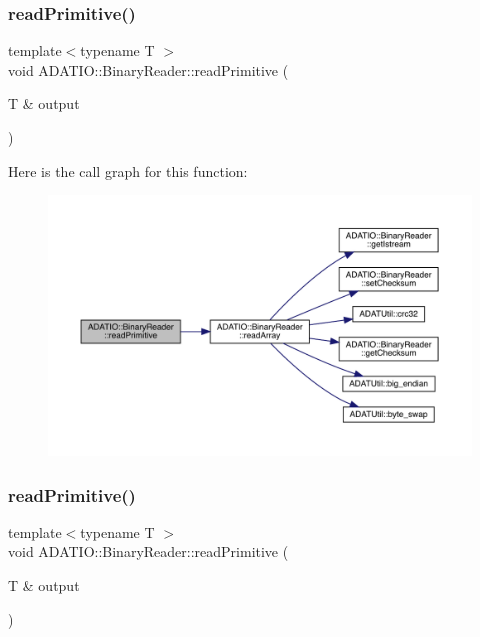 \subsubsection{\texorpdfstring{readPrimitive()}{readPrimitive()}\hspace{0.1cm}{\footnotesize\ttfamily [1/2]}}
{\footnotesize\ttfamily template$<$typename T $>$ \\
void A\+D\+A\+T\+I\+O\+::\+Binary\+Reader\+::read\+Primitive (\begin{DoxyParamCaption}\item[{T \&}]{output }\end{DoxyParamCaption})\hspace{0.3cm}{\ttfamily [protected]}}

Here is the call graph for this function\+:\nopagebreak
\begin{figure}[H]
\begin{center}
\leavevmode
\includegraphics[width=350pt]{da/dd9/classADATIO_1_1BinaryReader_aeb7e739afca615aff19646e64b8da320_cgraph}
\end{center}
\end{figure}
\mbox{\label{classADATIO_1_1BinaryReader_aeb7e739afca615aff19646e64b8da320}} 
\subsubsection{\texorpdfstring{readPrimitive()}{readPrimitive()}\hspace{0.1cm}{\footnotesize\ttfamily [2/2]}}
{\footnotesize\ttfamily template$<$typename T $>$ \\
void A\+D\+A\+T\+I\+O\+::\+Binary\+Reader\+::read\+Primitive (\begin{DoxyParamCaption}\item[{T \&}]{output }\end{DoxyParamCaption})\hspace{0.3cm}{\ttfamily [protected]}}

